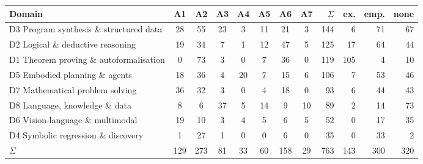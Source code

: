 \setlength{\tabcolsep}{2.6pt}
\begin{tabular}{@{}lcccccccr|rrr@{}}
\toprule
Domain & A1 & A2 & A3 & A4 & A5 & A6 & A7 & $\Sigma$ & ex. & emp. & none \\
\midrule
D3 Program synthesis \& structured data & \cellcolor{nsblue!31}28 & \cellcolor{nsblue!54}55 & \cellcolor{nsblue!27}23 & \cellcolor{nsblue!10}3 & \cellcolor{nsblue!17}11 & \cellcolor{nsblue!25}21 & \cellcolor{nsblue!10}3 & 144 & 6 & 71 & 67 \\
D2 Logical \& deductive reasoning & \cellcolor{nsblue!24}19 & \cellcolor{nsblue!36}34 & \cellcolor{nsblue!13}7 & \cellcolor{nsblue!8}1 & \cellcolor{nsblue!18}12 & \cellcolor{nsblue!47}47 & \cellcolor{nsblue!12}5 & 125 & 17 & 64 & 44 \\
D1 Theorem proving \& autoformalisation & \textcolor{black!30}{0} & \cellcolor{nsblue!70}73 & \cellcolor{nsblue!10}3 & \textcolor{black!30}{0} & \cellcolor{nsblue!13}7 & \cellcolor{nsblue!38}36 & \textcolor{black!30}{0} & 119 & 105 & 4 & 10 \\
D5 Embodied planning \& agents & \cellcolor{nsblue!23}18 & \cellcolor{nsblue!38}36 & \cellcolor{nsblue!11}4 & \cellcolor{nsblue!24}20 & \cellcolor{nsblue!13}7 & \cellcolor{nsblue!20}15 & \cellcolor{nsblue!13}6 & 106 & 7 & 53 & 46 \\
D7 Mathematical problem solving & \cellcolor{nsblue!38}36 & \cellcolor{nsblue!35}32 & \cellcolor{nsblue!10}3 & \textcolor{black!30}{0} & \cellcolor{nsblue!11}4 & \cellcolor{nsblue!23}18 & \textcolor{black!30}{0} & 93 & 6 & 44 & 43 \\
D8 Language, knowledge \& data & \cellcolor{nsblue!14}8 & \cellcolor{nsblue!13}6 & \cellcolor{nsblue!39}37 & \cellcolor{nsblue!12}5 & \cellcolor{nsblue!19}14 & \cellcolor{nsblue!15}9 & \cellcolor{nsblue!16}10 & 89 & 2 & 14 & 73 \\
D6 Vision-language \& multimodal & \cellcolor{nsblue!24}19 & \cellcolor{nsblue!16}10 & \cellcolor{nsblue!10}3 & \cellcolor{nsblue!11}4 & \cellcolor{nsblue!12}5 & \cellcolor{nsblue!13}6 & \cellcolor{nsblue!12}5 & 52 & 0 & 17 & 35 \\
D4 Symbolic regression \& discovery & \cellcolor{nsblue!8}1 & \cellcolor{nsblue!30}27 & \cellcolor{nsblue!8}1 & \textcolor{black!30}{0} & \textcolor{black!30}{0} & \cellcolor{nsblue!13}6 & \textcolor{black!30}{0} & 35 & 0 & 33 & 2 \\
\midrule
$\Sigma$ & 129 & 273 & 81 & 33 & 60 & 158 & 29 & 763 & 143 & 300 & 320 \\
\bottomrule
\end{tabular}
